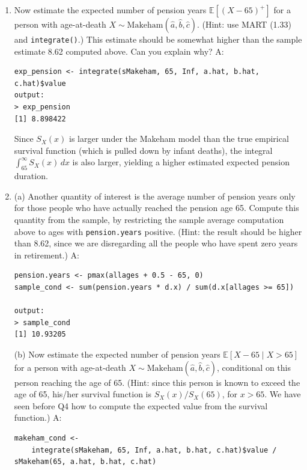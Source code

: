 \documentclass{article}
\begin{document}
\begin{enumerate}
\item[$\boldsymbol{Q_5}$] Now estimate the expected number of pension years $\mathbb{E}[(X - 65)^+]$ for a person with age-at-death $X \sim \text{Makeham}(\hat{a}, \hat{b}, \hat{c})$. (Hint: use MART (1.33) and \texttt{integrate()}.) This estimate should be somewhat higher than the sample estimate 8.62 computed above. Can you explain why?
\newline \newline A:
\begin{verbatim}
exp_pension <- integrate(sMakeham, 65, Inf, a.hat, b.hat, c.hat)$value
output:
> exp_pension
[1] 8.898422
\end{verbatim}
Since $S_X(x)$ is larger under the Makeham model than the true empirical survival function (which is pulled down by infant deaths), the integral $\int_{65}^\infty S_X(x)\,dx$ is also larger, yielding a higher estimated expected pension duration.



\newpage
\item[$\boldsymbol{Q_6}$] (a) Another quantity of interest is the average number of pension years only for those people who have actually reached the pension age 65. Compute this quantity from the sample, by restricting the sample average computation above to ages with \texttt{pension.years} positive. (Hint: the result should be higher than 8.62, since we are disregarding all the people who have spent zero years in retirement.)
\newline \newline A:
\begin{verbatim}
pension.years <- pmax(allages + 0.5 - 65, 0)
sample_cond <- sum(pension.years * d.x) / sum(d.x[allages >= 65])

output:
> sample_cond
[1] 10.93205
\end{verbatim}

(b) Now estimate the expected number of pension years $\mathbb{E}[X - 65 \mid X > 65]$ for a person with age-at-death $X \sim \text{Makeham}(\hat{a}, \hat{b}, \hat{c})$, conditional on this person reaching the age of 65. (Hint: since this person is known to exceed the age of 65, his/her survival function is $S_X(x)/S_X(65)$, for $x > 65$. We have seen before Q4 how to compute the expected value from the survival function.)
\newline \newline A:
\begin{verbatim}
makeham_cond <- 
    integrate(sMakeham, 65, Inf, a.hat, b.hat, c.hat)$value / sMakeham(65, a.hat, b.hat, c.hat)


\end{verbatim}
\end{enumerate}
\end{document}
